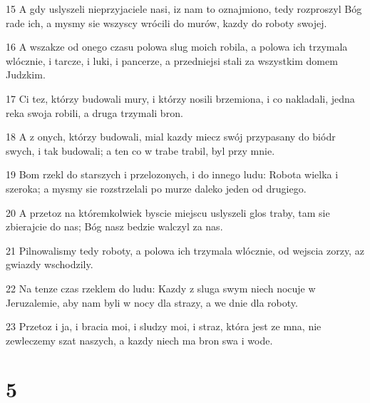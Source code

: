 \par 15 A gdy uslyszeli nieprzyjaciele nasi, iz nam to oznajmiono, tedy rozproszyl Bóg rade ich, a mysmy sie wszyscy wrócili do murów, kazdy do roboty swojej.
\par 16 A wszakze od onego czasu polowa slug moich robila, a polowa ich trzymala wlócznie, i tarcze, i luki, i pancerze, a przedniejsi stali za wszystkim domem Judzkim.
\par 17 Ci tez, którzy budowali mury, i którzy nosili brzemiona, i co nakladali, jedna reka swoja robili, a druga trzymali bron.
\par 18 A z onych, którzy budowali, mial kazdy miecz swój przypasany do biódr swych, i tak budowali; a ten co w trabe trabil, byl przy mnie.
\par 19 Bom rzekl do starszych i przelozonych, i do innego ludu: Robota wielka i szeroka; a mysmy sie rozstrzelali po murze daleko jeden od drugiego.
\par 20 A przetoz na któremkolwiek byscie miejscu uslyszeli glos traby, tam sie zbierajcie do nas; Bóg nasz bedzie walczyl za nas.
\par 21 Pilnowalismy tedy roboty, a polowa ich trzymala wlócznie, od wejscia zorzy, az gwiazdy wschodzily.
\par 22 Na tenze czas rzeklem do ludu: Kazdy z sluga swym niech nocuje w Jeruzalemie, aby nam byli w nocy dla strazy, a we dnie dla roboty.
\par 23 Przetoz i ja, i bracia moi, i sludzy moi, i straz, która jest ze mna, nie zewleczemy szat naszych, a kazdy niech ma bron swa i wode.

\chapter{5}

